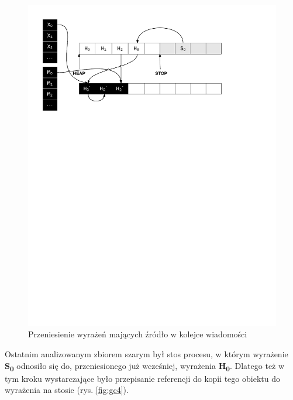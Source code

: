 \begin{figure}[h]
\centerline{\includegraphics[scale=0.75, clip, trim=10mm 185mm 45mm 10mm]{gc_3}}
\caption{Przeniesienie wyrażeń mających źródło w kolejce wiadomości}
\label{fig:gc3}
\end{figure}

Ostatnim analizowanym zbiorem szarym był stos procesu, w którym wyrażenie \textbf{S\textsubscript{0}} odnosiło się do, przeniesionego już wcześniej, wyrażenia \textbf{H\textsubscript{0}}. Dlatego też w tym kroku wystarczające było przepisanie referencji do kopii tego obiektu do wyrażenia na stosie (rys. \ref{fig:gc4}).

